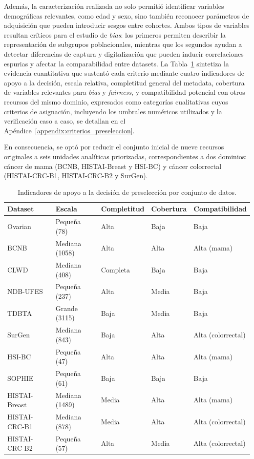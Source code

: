 Además, la caracterización realizada no solo permitió identificar variables demográficas relevantes, como edad y sexo, sino también reconocer parámetros de adquisición que pueden introducir sesgos entre cohortes. Ambos tipos de variables resultan críticos para el estudio de \textit{bias}: los primeros permiten describir la representación de subgrupos poblacionales, mientras que los segundos ayudan a detectar diferencias de captura y digitalización que pueden inducir correlaciones espurias y afectar la comparabilidad entre datasets. La Tabla~\ref{tab:indicadores_preseleccion} sintetiza la evidencia cuantitativa que sustentó cada criterio mediante cuatro indicadores de apoyo a la decisión, escala relativa, completitud general del metadata, cobertura de variables relevantes para \textit{bias} y \textit{fairness}, y compatibilidad potencial con otros recursos del mismo dominio, expresados como categorías cualitativas cuyos criterios de asignación, incluyendo los umbrales numéricos utilizados y la verificación caso a caso, se detallan en el Apéndice~\ref{appendix:criterios_preseleccion}.

En consecuencia, se optó por reducir el conjunto inicial de nueve recursos originales a seis unidades analíticas priorizadas, correspondientes a dos dominios: cáncer de mama (BCNB, HISTAI-Breast y HSI-BC) y cáncer colorrectal (HISTAI-CRC-B1, HISTAI-CRC-B2 y SurGen).

\begin{table}[htbp]
\centering
\caption{Indicadores de apoyo a la decisión de preselección por conjunto de datos.}
\label{tab:indicadores_preseleccion}
\small
\begin{tabular}{lllll}
\toprule
Dataset & Escala & Completitud & Cobertura & Compatibilidad \\
\midrule
Ovarian       & Pequeña (78) & Alta  & Baja   & Baja \\
BCNB          & Mediana (1058) & Alta & Alta  & Alta (mama) \\
CLWD          & Mediana (408) & Completa & Baja & Baja \\
NDB-UFES      & Pequeña (237) & Alta & Media & Baja \\
TDBTA         & Grande (3115) & Baja & Media & Baja \\
SurGen        & Mediana (843) & Baja & Alta  & Alta (colorrectal) \\

HSI-BC      & Pequeña (47)  & Alta & Alta  & Alta (mama) \\
SOPHIE        & Pequeña (61)  & Baja & Baja  & Baja \\
HISTAI-Breast & Mediana (1489) & Media & Alta & Alta (mama) \\
HISTAI-CRC-B1 & Mediana (878) & Media & Alta & Alta (colorrectal) \\
HISTAI-CRC-B2 & Pequeña (57) & Alta & Media & Alta (colorrectal) \\
\bottomrule
\end{tabular}
\end{table}

